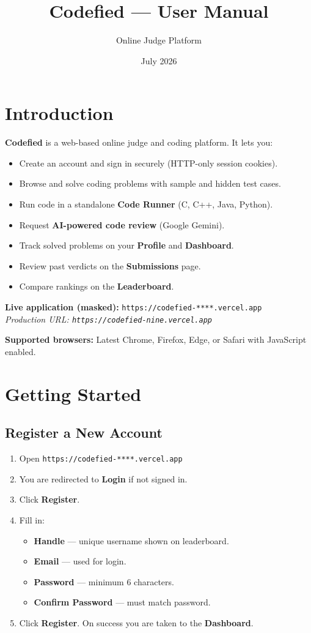 \documentclass[11pt,a4paper]{article}
\title{\textbf{Codefied --- User Manual}}
\author{Online Judge Platform}
\date{July 2026}
\newcommand{\appurl}{\texttt{https://codefied-****.vercel.app}}
\begin{document}
\maketitle
\tableofcontents
\newpage

\section{Introduction}

\textbf{Codefied} is a web-based online judge and coding platform. It lets you:
\begin{itemize}[noitemsep]
  \item Create an account and sign in securely (HTTP-only session cookies).
  \item Browse and solve coding problems with sample and hidden test cases.
  \item Run code in a standalone \textbf{Code Runner} (C, C++, Java, Python).
  \item Request \textbf{AI-powered code review} (Google Gemini).
  \item Track solved problems on your \textbf{Profile} and \textbf{Dashboard}.
  \item Review past verdicts on the \textbf{Submissions} page.
  \item Compare rankings on the \textbf{Leaderboard}.
\end{itemize}

\textbf{Live application (masked):} \appurl\\
\textit{Production URL: \texttt{https://codefied-nine.vercel.app}}

\textbf{Supported browsers:} Latest Chrome, Firefox, Edge, or Safari with JavaScript enabled.

\section{Getting Started}

\subsection{Register a New Account}
\begin{enumerate}
  \item Open \appurl
  \item You are redirected to \textbf{Login} if not signed in.
  \item Click \textbf{Register}.
  \item Fill in:
  \begin{itemize}[noitemsep]
    \item \textbf{Handle} --- unique username shown on leaderboard.
    \item \textbf{Email} --- used for login.
    \item \textbf{Password} --- minimum 6 characters.
    \item \textbf{Confirm Password} --- must match password.
  \end{itemize}
  \item Click \textbf{Register}. On success you are taken to the \textbf{Dashboard}.
\end{enumerate}
\end{document}
